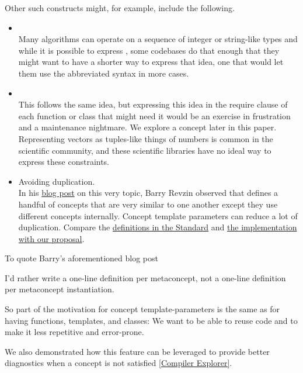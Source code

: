 \documentclass{wg21}
\begin{document}
Other such constructs might, for example, include the following.
\begin{itemize}
\item {}\\
    Many algorithms can operate on a sequence of integer or string-like types and while it is possible to express
    , some codebases do that enough that they might want to have a shorter way to express that idea,
    one that would let them use the abbreviated syntax in more cases.

\item {} \\
    This follows the same idea, but expressing this idea in the require clause of each function or class that might need it would be an exercise in frustration and a maintenance nightmare. We explore a  concept later in this paper.
    Representing vectors as tuples-like things of numbers is common in the scientific community, and these scientific libraries have no ideal way to express these constraints.

\item Avoiding duplication.\\
    In his \href{https://brevzin.github.io/c++/2019/01/09/concept-templates/}{blog post} on this very topic, Barry Revzin observed that  defines a handful of concepts that are very
    similar to one another except they use different concepts internally. Concept template parameters can reduce a lot of duplication.
    Compare the \href{https://eel.is/c++draft/indirectcallable.indirectinvocable}{definitions in the Standard} and \href{https://godbolt.org/z/ohKsoKh9G}{the implementation with our proposal}.
\end{itemize}

To quote Barry's aforementioned blog post

\begin{quoteblock}
I’d rather write a one-line definition per metaconcept, not a one-line definition per metaconcept instantiation.
\end{quoteblock}

So part of the motivation for concept template-parameters is the same as for having functions, templates, and classes:
We want to be able to reuse code and to make it less repetitive and error-prone.


We also demonstrated how this feature can be leveraged to provide better diagnostics when a concept is not satisfied \href{https://compiler-explorer.com/z/sPz5faEbP}{[Compiler Explorer]}.
\end{document}
